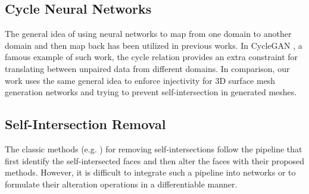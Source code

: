 \subsection{Cycle Neural Networks}
The general idea of using neural networks to map from one domain to another domain and then map back has been utilized in previous works. In CycleGAN \cite{CycleGAN2017}, a famous example of such work, the cycle relation provides an extra constraint for translating between unpaired data from different domains. In comparison, our work uses the same general idea to enforce injectivity for 3D surface mesh generation networks and trying to prevent self-intersection in generated meshes. 

\subsection{Self-Intersection Removal}
The classic methods (e.g. \cite{edgeswap,removeoffset}) for removing self-intersections follow the pipeline that first identify the self-intersected faces and then alter the faces with their proposed methods. However, it is difficult to integrate such a pipeline into networks or to formulate their alteration operations in a differentiable manner.\\

